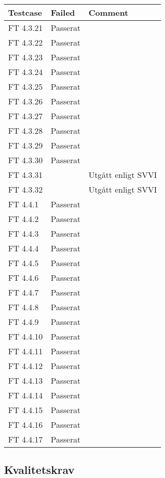 \documentclass[a4paper]{article}
\begin{document}
\begin{tabular}{| l | l | p{11cm} |}
\hline
Testcase &  Failed & Comment\\
\hline
FT 4.3.21 & Passerat & \\
\hline
FT 4.3.22 & Passerat & \\
\hline
FT 4.3.23 & Passerat & \\
\hline
FT 4.3.24 & Passerat & \\
\hline
FT 4.3.25 & Passerat & \\
\hline
FT 4.3.26 & Passerat & \\
\hline
FT 4.3.27 & Passerat & \\
\hline
FT 4.3.28 & Passerat & \\
\hline
FT 4.3.29 & Passerat & \\
\hline
FT 4.3.30 & Passerat & \\
\hline
FT 4.3.31 & & Utgått enligt SVVI\\
\hline
FT 4.3.32 & & Utgått enligt SVVI\\
\hline
FT 4.4.1 & Passerat & \\
\hline
FT 4.4.2 & Passerat & \\
\hline
FT 4.4.3 & Passerat & \\
\hline
FT 4.4.4 & Passerat & \\
\hline
FT 4.4.5 & Passerat & \\
\hline
FT 4.4.6 & Passerat & \\
\hline
FT 4.4.7 & Passerat & \\
\hline
FT 4.4.8 & Passerat & \\
\hline
FT 4.4.9 & Passerat & \\
\hline
FT 4.4.10 & Passerat & \\
\hline
FT 4.4.11 & Passerat & \\
\hline
FT 4.4.12 & Passerat & \\
\hline
FT 4.4.13 & Passerat & \\
\hline
FT 4.4.14 & Passerat & \\
\hline
FT 4.4.15 & Passerat & \\
\hline
FT 4.4.16 & Passerat & \\
\hline
FT 4.4.17 & Passerat & \\
\hline
\end{tabular}




\subsection{Kvalitetskrav}
\end{document}
